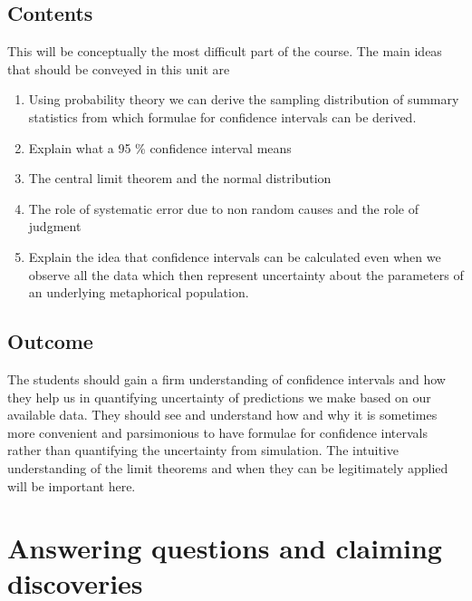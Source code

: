 \documentclass[
  letterpaper,
]{scrbook}
\providecommand{\tightlist}{%
  \setlength{\itemsep}{0pt}\setlength{\parskip}{0pt}}\usepackage{longtable,booktabs,array}
\begin{document}
\hypertarget{contents-8}{%
\section{Contents}\label{contents-8}}

This will be conceptually the most difficult part of the course. The
main ideas that should be conveyed in this unit are

\begin{enumerate}
\def\labelenumi{\arabic{enumi}.}
\tightlist
\item
  Using probability theory we can derive the sampling distribution of
  summary statistics from which formulae for confidence intervals can be
  derived.
\item
  Explain what a 95 \% confidence interval means
\item
  The central limit theorem and the normal distribution
\item
  The role of systematic error due to non random causes and the role of
  judgment
\item
  Explain the idea that confidence intervals can be calculated even when
  we observe all the data which then represent uncertainty about the
  parameters of an underlying metaphorical population.
\end{enumerate}

\hypertarget{outcome-8}{%
\section{Outcome}\label{outcome-8}}

The students should gain a firm understanding of confidence intervals
and how they help us in quantifying uncertainty of predictions we make
based on our available data. They should see and understand how and why
it is sometimes more convenient and parsimonious to have formulae for
confidence intervals rather than quantifying the uncertainty from
simulation. The intuitive understanding of the limit theorems and when
they can be legitimately applied will be important here.


\hypertarget{answering-questions-and-claiming-discoveries}{%
\chapter{Answering questions and claiming
discoveries}\label{answering-questions-and-claiming-discoveries}}
\end{document}
